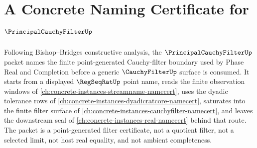 \chapter{A Concrete Naming Certificate for $\PrincipalCauchyFilterUp$}
\label{ch:concrete-instances-principal-cauchy-filter-namecert}

Following Bishop--Bridges constructive analysis, the $\PrincipalCauchyFilterUp$ packet names the finite point-generated Cauchy-filter boundary used by Phase Real and Completion before a generic $\CauchyFilterUp$ surface is consumed. It starts from a displayed $\RegSeqRatUp$ point name, reads the finite observation windows of \autoref{ch:concrete-instances-streamname-namecert}, uses the dyadic tolerance rows of \autoref{ch:concrete-instances-dyadicratcore-namecert}, saturates into the finite filter surface of \autoref{ch:concrete-instances-cauchyfilter-namecert}, and leaves the downstream seal of \autoref{ch:concrete-instances-real-namecert} behind that route. The packet is a point-generated filter certificate, not a quotient filter, not a selected limit, not host real equality, and not ambient completeness.

